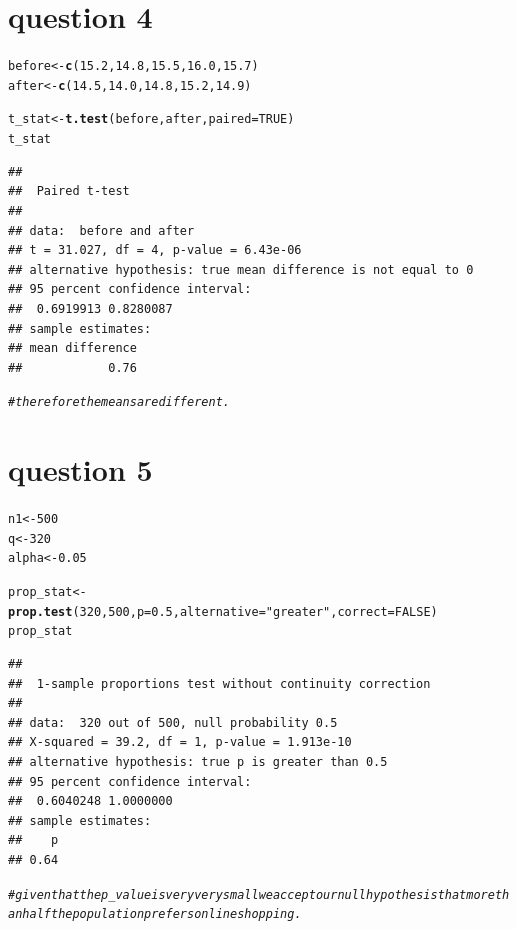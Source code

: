 \documentclass{article}\usepackage[]{graphicx}\usepackage[]{xcolor}
\makeatletter
\newcommand{\hlnum}[1]{\textcolor[rgb]{0.686,0.059,0.569}{#1}}%
\newcommand{\hlsng}[1]{\textcolor[rgb]{0.192,0.494,0.8}{#1}}%
\newcommand{\hlcom}[1]{\textcolor[rgb]{0.678,0.584,0.686}{\textit{#1}}}%
\newcommand{\hldef}[1]{\textcolor[rgb]{0.345,0.345,0.345}{#1}}%
\newcommand{\hlkwb}[1]{\textcolor[rgb]{0.69,0.353,0.396}{#1}}%
\newcommand{\hlkwc}[1]{\textcolor[rgb]{0.333,0.667,0.333}{#1}}%
\newcommand{\hlkwd}[1]{\textcolor[rgb]{0.737,0.353,0.396}{\textbf{#1}}}%
\newenvironment{kframe}{%
 \def\at@end@of@kframe{}%
 \ifinner\ifhmode%
  \def\at@end@of@kframe{\end{minipage}}%
  \begin{minipage}{\columnwidth}%
 \fi\fi%
 \def\FrameCommand##1{\hskip\@totalleftmargin \hskip-\fboxsep
 \colorbox{shadecolor}{##1}\hskip-\fboxsep
     \hskip-\linewidth \hskip-\@totalleftmargin \hskip\columnwidth}%
 \MakeFramed {\advance\hsize-\width
   \@totalleftmargin\z@ \linewidth\hsize
   \@setminipage}}%
 {\par\unskip\endMakeFramed%
 \at@end@of@kframe}
\newenvironment{knitrout}{}{} %
\makeatother
\begin{document}
\section{question 4}
\begin{knitrout}
\color{fgcolor}\begin{kframe}
\begin{alltt}
\hldef{before} \hlkwb{<-} \hlkwd{c}\hldef{(}\hlnum{15.2}\hldef{,} \hlnum{14.8}\hldef{,} \hlnum{15.5}\hldef{,} \hlnum{16.0}\hldef{,} \hlnum{15.7}\hldef{)}
\hldef{after} \hlkwb{<-} \hlkwd{c}\hldef{(}\hlnum{14.5}\hldef{,} \hlnum{14.0}\hldef{,} \hlnum{14.8}\hldef{,} \hlnum{15.2}\hldef{,} \hlnum{14.9}\hldef{)}

\hldef{t_stat} \hlkwb{<-} \hlkwd{t.test}\hldef{(before, after,} \hlkwc{paired} \hldef{=} \hlnum{TRUE}\hldef{)}
\hldef{t_stat}
\end{alltt}
\begin{verbatim}
## 
## 	Paired t-test
## 
## data:  before and after
## t = 31.027, df = 4, p-value = 6.43e-06
## alternative hypothesis: true mean difference is not equal to 0
## 95 percent confidence interval:
##  0.6919913 0.8280087
## sample estimates:
## mean difference 
##            0.76
\end{verbatim}
\begin{alltt}
\hlcom{# therefore the means are different.}
\end{alltt}
\end{kframe}
\end{knitrout}
\section{question 5}

\begin{knitrout}
\color{fgcolor}\begin{kframe}
\begin{alltt}
\hldef{n1} \hlkwb{<-} \hlnum{500}
\hldef{q} \hlkwb{<-} \hlnum{320}
\hldef{alpha} \hlkwb{<-} \hlnum{0.05}

\hldef{prop_stat} \hlkwb{<-} \hlkwd{prop.test}\hldef{(}\hlnum{320}\hldef{,} \hlnum{500}\hldef{,} \hlkwc{p}\hldef{=}\hlnum{0.5}\hldef{,} \hlkwc{alternative} \hldef{=} \hlsng{"greater"}\hldef{,} \hlkwc{correct}\hldef{=}\hlnum{FALSE}\hldef{)}
\hldef{prop_stat}
\end{alltt}
\begin{verbatim}
## 
## 	1-sample proportions test without continuity correction
## 
## data:  320 out of 500, null probability 0.5
## X-squared = 39.2, df = 1, p-value = 1.913e-10
## alternative hypothesis: true p is greater than 0.5
## 95 percent confidence interval:
##  0.6040248 1.0000000
## sample estimates:
##    p 
## 0.64
\end{verbatim}
\begin{alltt}
\hlcom{# given that the p_value is very very small we accept our null hypothesis that more than half the population prefers online shopping.}
\end{alltt}
\end{kframe}
\end{knitrout}
\end{document}
